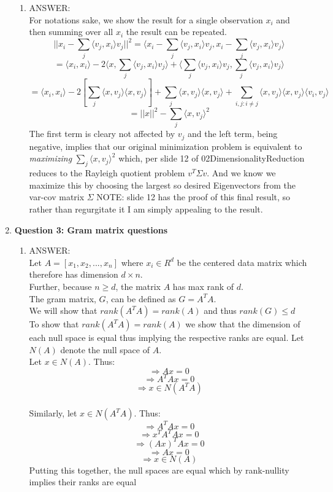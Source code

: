 \documentclass[a4paper, 12pt]{article}
\begin{document}
\begin{enumerate}
\begin{enumerate}
	\item ANSWER:
	\\
	For notations sake, we show the result for a single observation $x_i$ and then summing over all $x_i$ the result can be repeated. 
	\\ $$ ||x_i - \sum_j \langle v_j, x_i \rangle v_j||^2 = \langle x_i - \sum_j\langle v_j, x_i \rangle v_j ,   x_i - \sum_j\langle v_j, x_i \rangle v_j \rangle$$
	$$ = \langle x_i, x_i \rangle  - 2 \langle x, \sum_j\langle v_j, x_i \rangle v_j \rangle  + \langle  \sum_j\langle v_j, x_i \rangle v_j, \sum_j\langle v_j, x_i \rangle v_j \rangle      $$
	$$ = \langle x_i, x_i \rangle - 2[\sum_j \langle x, v_j \rangle \langle x, v_j \rangle ]  + \sum_j \langle x, v_j \rangle \langle x, v_j \rangle  +  \sum_{i,j: i \ne j} \langle x, v_j \rangle \langle x, v_j \rangle \langle v_i, v_j \rangle$$
	$$ = ||x||^2 - \sum_j \langle x, v_j \rangle^2  $$	
	The first term is cleary not affected by $v_j$ and the left term, being negative, implies that our original minimization problem is equivalent to \textit{maximizing}  $\sum_j \langle x, v_j \rangle^2  $ which, per slide 12 of 02DimensionalityReduction reduces to the Rayleigh quotient problem $v^T\Sigma v$. And we know we maximize this by choosing the largest so desired Eigenvectors from the var-cov matrix $\Sigma$ NOTE: slide 12 has the proof of this final result, so rather than regurgitate it I am simply appealing to the result. 
	\end{enumerate}

\item \textbf{Question 3: Gram matrix questions}
	 
	\begin{enumerate}
	\item ANSWER:
	\\
	Let $A = [x_1, x_2, ... , x_n]$ where $x_i \in R^d$ be the centered data matrix which therefore has dimension $d \times n$.
	\\Further, because $n \ge d$, the matrix $A$ has max rank of $d$.
	\\The gram matrix, $G$, can be defined as $G = A^TA$.
	\\ We will show that $rank(A^TA) = rank(A)$ and thus $rank(G) \le d$
	\\ To show that $rank(A^TA) = rank(A)$ we show that the dimension of each null space is equal thus implying the respective ranks are equal. Let $N(A)$ denote the null space of $A$.
	\\ Let $x \in N(A)$. Thus:
	$$\Rightarrow Ax = 0$$
	$$\Rightarrow A^TAx = 0$$
	$$\Rightarrow  x \in N(A^TA) $$
	\\ Similarly, let $x \in N(A^TA)$. Thus:
	$$\Rightarrow A^TAx = 0$$
	$$\Rightarrow x^TA^TAx = 0$$
	$$\Rightarrow (Ax)^TAx = 0$$
	$$\Rightarrow Ax = 0$$
	$$\Rightarrow  x \in N(A) $$
	Putting this together, the null spaces are equal which by rank-nullity implies their ranks are equal


\end{enumerate}
\end{enumerate}
\end{document}
